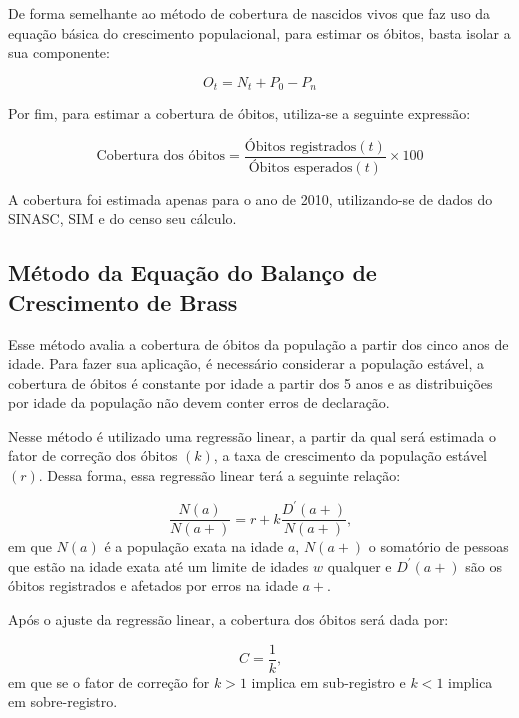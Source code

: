 \documentclass[
  12pt,
  a4paper,
]{scrreprt}
\begin{document}
De forma semelhante ao método de cobertura de nascidos vivos que faz uso
da equação básica do crescimento populacional, para estimar os óbitos,
basta isolar a sua componente:

\[
O_t = N_t + P_{0} - P_n
\]

Por fim, para estimar a cobertura de óbitos, utiliza-se a seguinte
expressão:

\[
\text{Cobertura dos óbitos} = \frac{\text{Óbitos registrados}\left(t\right)}{\text{Óbitos esperados}\left(t\right)} \times 100
\]

\vspace{12pt}

A cobertura foi estimada apenas para o ano de 2010, utilizando-se de
dados do SINASC, SIM e do censo seu cálculo.

\subsection{Método da Equação do Balanço de Crescimento de
Brass}\label{muxe9todo-da-equauxe7uxe3o-do-balanuxe7o-de-crescimento-de-brass}

Esse método avalia a cobertura de óbitos da população a partir dos cinco
anos de idade. Para fazer sua aplicação, é necessário considerar a
população estável, a cobertura de óbitos é constante por idade a partir
dos 5 anos e as distribuições por idade da população não devem conter
erros de declaração.

\vspace{12pt}

Nesse método é utilizado uma regressão linear, a partir da qual será
estimada o fator de correção dos óbitos \(\left(k\right)\), a taxa de
crescimento da população estável \(\left(r\right)\). Dessa forma, essa
regressão linear terá a seguinte relação:

\[
\frac{N\left(a\right)}{N\left(a+\right)} = r + k\frac{D^{'}\left(a+\right)}{N\left(a+\right)}\text{,}
\] em que \(N\left(a\right)\) é a população exata na idade \(a\),
\(N\left(a+\right)\) o somatório de pessoas que estão na idade exata até
um limite de idades \(w\) qualquer e \(D^{'}\left(a+\right)\) são os
óbitos registrados e afetados por erros na idade \(a+\).

\vspace{12pt}

Após o ajuste da regressão linear, a cobertura dos óbitos será dada por:

\[
C = \frac{1}{k}\text{,}
\] em que se o fator de correção for \(k > 1\) implica em sub-registro e
\(k<1\) implica em sobre-registro.
\end{document}
